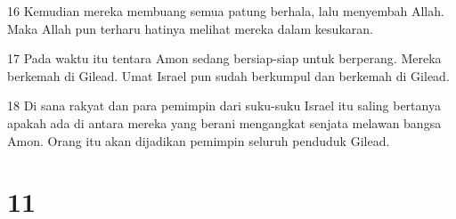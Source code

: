 \par 16 Kemudian mereka membuang semua patung berhala, lalu menyembah Allah. Maka Allah pun terharu hatinya melihat mereka dalam kesukaran.
\par 17 Pada waktu itu tentara Amon sedang bersiap-siap untuk berperang. Mereka berkemah di Gilead. Umat Israel pun sudah berkumpul dan berkemah di Gilead.
\par 18 Di sana rakyat dan para pemimpin dari suku-suku Israel itu saling bertanya apakah ada di antara mereka yang berani mengangkat senjata melawan bangsa Amon. Orang itu akan dijadikan pemimpin seluruh penduduk Gilead.

\chapter{11}

